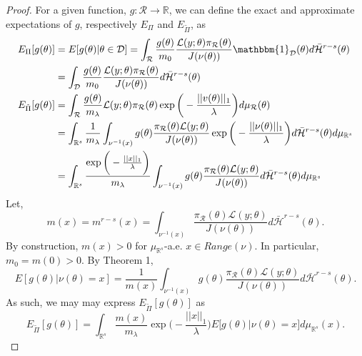 \documentclass[10pt,fleqn]{article}
\DeclareMathOperator{\1}{\mathbbm{1}}
\begin{document}
\begin{proof}
For a given function, $g:\mathcal{R}\to\mathbb{R}$, we can define the exact and approximate expectations of $g$, respectively $E_\Pi$ and $E_{\tilde{\Pi}}$, as
\begin{align*}
E_\Pi[g(\theta)] &= E[g(\theta)|\theta\in\mathcal{D}] = \int_\mathcal{R} \frac{g(\theta)}{m_0} \frac{\mathcal{L}(y;\theta)\pi_\mathcal{R}(\theta)}{J(\nu(\theta))}\mathbbm{1}_\mathcal{D}(\theta)d\bar{\mathcal{H}}^{r-s}(\theta) \\
&=\int_\mathcal{D} \frac{g(\theta)}{m_0} \frac{\mathcal{L}(y;\theta)\pi_\mathcal{R}(\theta)}{J(\nu(\theta))}d\bar{\mathcal{H}}^{r-s}(\theta)\\
E_{\tilde{\Pi}}[g(\theta)] &= \int_\mathcal{R}  \frac{g(\theta)}{m_\lambda} \mathcal{L}(y;\theta)\pi_\mathcal{R}(\theta)\exp\bigg(-\frac{||v(\theta)||_1}{\lambda}\bigg)d\mu_\mathcal{R}(\theta) \\
&= \int_{\mathbb{R}^s} \frac{1}{m_\lambda} \int_{\nu^{-1}(x)} g(\theta) \frac{\pi_\mathcal{R}(\theta)\mathcal{L}(y;\theta)}{J(\nu(\theta))} \exp\bigg(-\frac{||\nu(\theta)||_1}{\lambda}\bigg) d\bar{\mathcal{H}}^{r-s}(\theta) d\mu_{\mathbb{R}^s} \\
&=\int_{\mathbb{R}^s} \frac{\exp\bigg(-\frac{||x||_1}{\lambda}\bigg) }{m_\lambda} \int_{\nu^{-1}(x)} g(\theta) \frac{\pi_\mathcal{R}(\theta)\mathcal{L}(y;\theta)}{J(\nu(\theta))} d\bar{\mathcal{H}}^{r-s}(\theta) d\mu_{\mathbb{R}^s} 
\end{align*}
Let, $$m(x) = m^{r-s}(x) = \int_{\nu^{-1}(x)}\frac{\pi_\mathcal{R}(\theta)\mathcal{L}(y;\theta)}{J(\nu(\theta))} d\bar{\mathcal{H}}^{r-s}(\theta) .$$
By construction, $m(x) > 0$ for $\mu_{\mathbb{R}^s}$-a.e. $x\in Range(\nu)$. In particular, $m_0=m(0)>0$. By Theorem 1,
\begin{equation}
E[g(\theta) | \nu(\theta) = x] = \frac{1}{m(x)} \int_{\nu^{-1}(x)} g(\theta)\frac{\pi_\mathcal{R}(\theta)\mathcal{L}(y;\theta)}{J(\nu(\theta))} d\bar{\mathcal{H}}^{r-s}(\theta).
\end{equation}
As such, we may may express $E_{\tilde{\Pi}}[g(\theta)]$ as 
\begin{equation}
E_{\tilde{\Pi}}[g(\theta)] = \int_{\mathbb{R}^s} \frac{m(x)}{m_\lambda}\exp\bigg(-\frac{||x||_1}{\lambda}\bigg) E\big[g(\theta)|\nu(\theta)=x\big] d\mu_{\mathbb{R}^s}(x).
\end{equation}


\end{proof}
\end{document}
